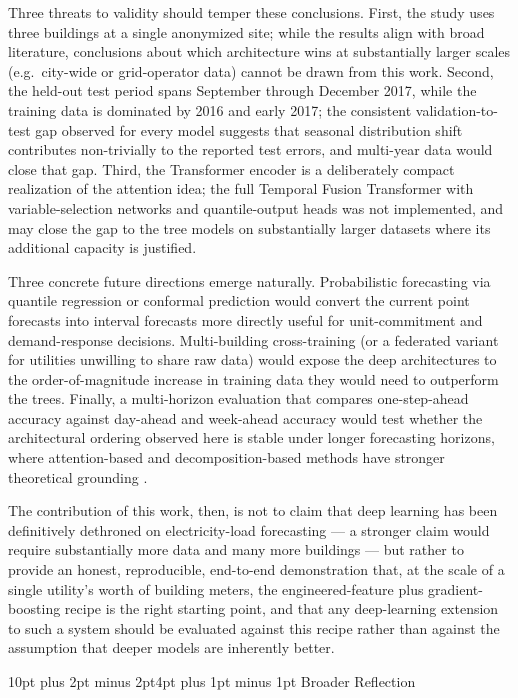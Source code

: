 \documentclass[12pt,a4paper,openany]{report}
\makeatletter
\renewcommand{\section}{\@startsection{section}{1}{\z@}%
  {10pt plus 2pt minus 2pt}{4pt plus 1pt minus 1pt}%
  {\normalfont\normalsize\bfseries}}
\makeatother
\begin{document}
Three threats to validity should temper these conclusions. First, the study uses three buildings at a single anonymized site; while the results align with broad literature, conclusions about which architecture wins at substantially larger scales (e.g.\ city-wide or grid-operator data) cannot be drawn from this work. Second, the held-out test period spans September through December 2017, while the training data is dominated by 2016 and early 2017; the consistent validation-to-test gap observed for every model suggests that seasonal distribution shift contributes non-trivially to the reported test errors, and multi-year data would close that gap. Third, the Transformer encoder is a deliberately compact realization of the attention idea; the full Temporal Fusion Transformer with variable-selection networks and quantile-output heads was not implemented, and may close the gap to the tree models on substantially larger datasets where its additional capacity is justified.

Three concrete future directions emerge naturally. Probabilistic forecasting via quantile regression or conformal prediction \cite{ref_lim_tft} would convert the current point forecasts into interval forecasts more directly useful for unit-commitment and demand-response decisions. Multi-building cross-training (or a federated variant for utilities unwilling to share raw data) would expose the deep architectures to the order-of-magnitude increase in training data they would need to outperform the trees. Finally, a multi-horizon evaluation that compares one-step-ahead accuracy against day-ahead and week-ahead accuracy would test whether the architectural ordering observed here is stable under longer forecasting horizons, where attention-based and decomposition-based methods have stronger theoretical grounding \cite{ref_lim_tft, ref_taylor_short_term}.

The contribution of this work, then, is not to claim that deep learning has been definitively dethroned on electricity-load forecasting --- a stronger claim would require substantially more data and many more buildings --- but rather to provide an honest, reproducible, end-to-end demonstration that, at the scale of a single utility's worth of building meters, the engineered-feature plus gradient-boosting recipe is the right starting point, and that any deep-learning extension to such a system should be evaluated against this recipe rather than against the assumption that deeper models are inherently better.

\section{Broader Reflection}
\end{document}
